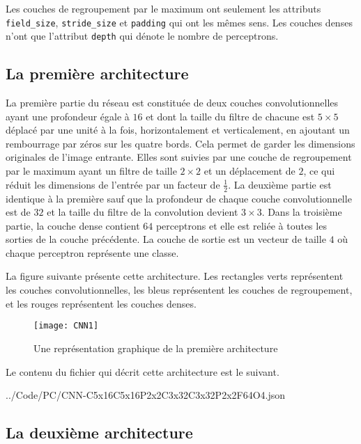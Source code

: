 Les couches de regroupement par le maximum ont seulement les attributs \texttt{field\_size},
\texttt{stride\_size} et \texttt{padding} qui ont les mêmes sens. Les couches denses
n'ont que l'attribut \texttt{depth} qui dénote le nombre de perceptrons.

\subsection{La première architecture}

La première partie du réseau est constituée de deux couches convolutionnelles
ayant une profondeur égale à $16$ et dont la taille du filtre de chacune est
$5 \times 5$ déplacé par une unité à la fois, horizontalement et verticalement,
en ajoutant un rembourrage par zéros sur les quatre bords. Cela permet de garder
les dimensions originales de l'image entrante.
Elles sont suivies par une couche de regroupement par le maximum ayant un filtre
de taille $2 \times 2$ et un déplacement de $2$, ce qui réduit les dimensions de
l'entrée par un facteur de $\frac{1}{2}$. La deuxième partie est
identique à la première sauf que la profondeur de chaque couche convolutionnelle
est de $32$ et la taille du filtre de la convolution devient $3 \times 3$. Dans la
troisième partie, la couche dense contient $64$ perceptrons et elle est reliée
à toutes les sorties de la couche précédente. La couche de sortie est un
vecteur de taille $4$ où chaque perceptron représente une classe.

La figure suivante présente cette architecture. Les rectangles verts représentent
les couches convolutionnelles, les bleus représentent les couches de regroupement,
et les rouges représentent les couches denses.

\begin{figure}[h]
  \centering
  \texttt{[image: CNN1]}
  \caption{Une représentation graphique de la première architecture}
\end{figure}

\vspace{2em}

Le contenu du fichier qui décrit cette architecture est le suivant.

\medskip


{../Code/PC/CNN-C5x16C5x16P2x2C3x32C3x32P2x2F64O4.json}

\subsection{La deuxième architecture}

